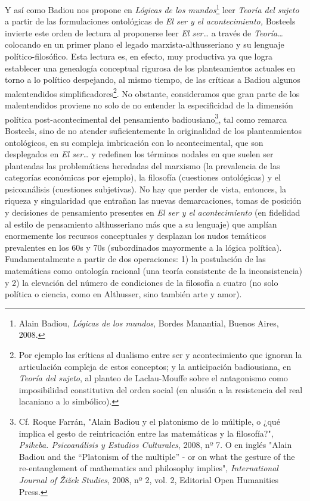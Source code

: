 Y así como Badiou nos propone en \emph{Lógicas de los mundos}\footnote{Alain
  Badiou, \emph{Lógicas de los mundos}, Bordes Manantial, Buenos Aires,
  2008.} leer \emph{Teoría del sujeto} a partir de las formulaciones
ontológicas de \emph{El ser y el acontecimiento,} Bosteels invierte este
orden de lectura al proponerse leer \emph{El ser\ldots{}} a través de
\emph{Teoría\ldots{}} colocando en un primer plano el legado
marxista-althusseriano y su lenguaje político-filosófico. Esta lectura
es, en efecto, muy productiva ya que logra establecer una genealogía
conceptual rigurosa de los planteamientos actuales en torno a lo
político despejando, al mismo tiempo, de las críticas a Badiou algunos
malentendidos simplificadores\footnote{Por ejemplo las críticas al
  dualismo entre ser y acontecimiento que ignoran la articulación
  compleja de estos conceptos; y la anticipación badiousiana, en
  \emph{Teoría del sujeto}, al planteo de Laclau-Mouffe sobre el
  antagonismo como imposibilidad constitutiva del orden social (en
  alusión a la resistencia del real lacaniano a lo simbólico).}. No
obstante, consideramos que gran parte de los malentendidos proviene no
solo de no entender la especificidad de la dimensión política
post-acontecimental del pensamiento badiousiano\footnote{Cf. Roque
  Farrán, "Alain Badiou y el platonismo de lo múltiple, o ¿qué implica
  el gesto de reintricación entre las matemáticas y la filosofía?",
  \emph{Psikeba. Psicoanálisis y Estudios Culturales}, 2008, nº 7. O en
  inglés "Alain Badiou and the ``Platonism of the multiple'' - or on
  what the gesture of the re-entanglement of mathematics and philosophy
  implies", \emph{International Journal of Žižek Studies}, 2008, nº 2,
  vol. 2, Editorial Open Humanities Press.}, tal como remarca Bosteels,
sino de no atender suficientemente la originalidad de los planteamientos
ontológicos, en su compleja imbricación con lo acontecimental, que son
desplegados en \emph{El ser\ldots{}} y redefinen los términos nodales en
que suelen ser planteadas las problemáticas heredadas del marxismo (la
prevalencia de las categorías económicas por ejemplo), la filosofía
(cuestiones ontológicas) y el psicoanálisis (cuestiones subjetivas). No
hay que perder de vista, entonces, la riqueza y singularidad que
entrañan las nuevas demarcaciones, tomas de posición y decisiones de
pensamiento presentes en \emph{El ser y el acontecimiento} (en fidelidad
al estilo de pensamiento althusseriano más que a su lenguaje) que
amplían enormemente los recursos conceptuales y desplazan los nudos
temáticos prevalentes en los 60s y 70s (subordinados mayormente a la
lógica política). Fundamentalmente a partir de dos operaciones: 1) la
postulación de las matemáticas como ontología racional (una teoría
consistente de la inconsistencia) y 2) la elevación del número de
condiciones de la filosofía a cuatro (no solo política o ciencia, como
en Althusser, sino también arte y amor).

